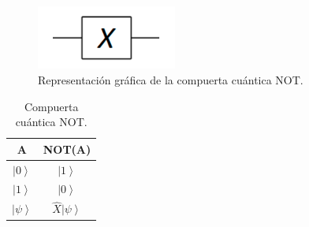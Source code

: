 \begin{minipage}{0.5\linewidth}
    \begin{figure}[H]
        \centering
        \includegraphics[height=2.1cm]{images/not_c.png}
        \caption{Representación gráfica de la compuerta cuántica NOT.}
    \end{figure}
    \begin{table}[H]
        \centering
        \begin{tabular}{cc} \hline
            A & NOT(A) \\ \hline
            $\left| 0 \right\rangle$ & $\left| 1 \right\rangle$ \\
            $\left| 1\right\rangle$ & $\left| 0 \right\rangle$ \\
            $\left| \psi \right\rangle$ & $\hat{X}\left| \psi \right\rangle$ \\ \hline
        \end{tabular}
        \caption{Compuerta cuántica NOT.}
    \end{table}
\end{minipage}
